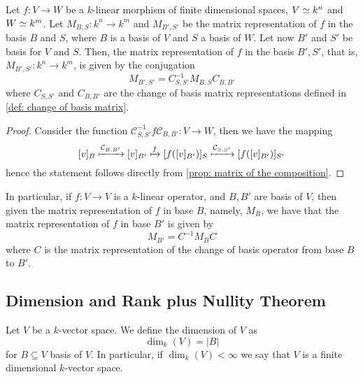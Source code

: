 \begin{proposition}
    \label{prop: change of basis, linear morphism}
    Let \(f : V \to W\) be a \(k\)-linear morphism of finite dimensional spaces,
    \(V \simeq k^n\) and \(W \simeq k^m\). Let \(M_{B, S} : k^n \to k^m\) and \(M_{B',
            S'}\) be the matrix representation of \(f\) in the basis \(B\) and \(S\),
    where \(B\) is a basis of \(V\) and \(S\) a basis of \(W\). Let now \(B'\) and
    \(S'\) be basis for \(V\) and \(S\). Then, the matrix representation of \(f\)
    in the basis \(B', S'\), that is, \(M_{B', S'} : k^n \to k^m\), is given by
    the conjugation
    \[
        M_{B', S'} = C_{S, S'}^{-1} M_{B, S} C_{B, B'}
    \]
    where \(C_{S, S'}\) and \(C_{B, B'}\) are the change of basis matrix
    representations defined in \cref{def: change of basis matrix}.
\end{proposition}

\begin{proof}
    Consider the function \(\mathcal{C}_{S, S'}^{-1}  f  \mathcal{C}_{B,
        B'} : V \to W\), then we have the mapping
    \[
        [v]_B \xmapsto{\mathcal{C}_{B, B'}} [v]_{B'}
        \xmapsto f [f([v]_{B'})]_S
        \xmapsto{\mathcal{C}_{S, S'}} [f([v]_{B'})]_{S'}
    \]
    hence the statement follows directly from \cref{prop: matrix of the
        composition}.
\end{proof}

\begin{corollary}\label{cor: change of basis, linear operator}
    In particular, if \(f : V \to V\) is a \(k\)-linear operator, and \(B, B'\)
    are basis of \(V\), then given the matrix representation of \(f\) in base
    \(B\), namely, \(M_B\), we have that the matrix representation of \(f\) in
    base \(B'\) is given by
    \[
        M_{B'} = C^{-1} M_B C
    \]
    where \(C\) is the matrix representation of the change of basis operator from
    base \(B\) to \(B'\).
\end{corollary}

\subsection{Dimension and Rank plus Nullity Theorem}

\begin{definition}
    Let \(V\) be a \(k\)-vector space. We define the dimension of \(V\) as
    \[
        \dim_k(V) = |B|
    \]
    for \(B \subseteq V\) basis of \(V\). In particular, if \(\dim_k(V) < \infty\)
    we say that \(V\) is a finite dimensional \(k\)-vector space.
\end{definition}

